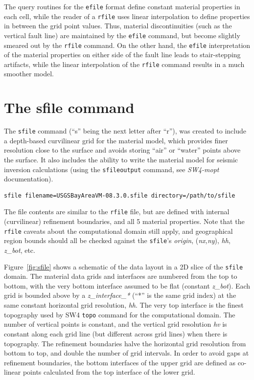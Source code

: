 \documentclass[11pt]{report}
\begin{document}
The query routines for the {\tt efile} format define constant material properties in each cell,
while the reader of a {\tt rfile} uses linear interpolation to define properties in between the grid
point values. Thus, material discontinuities (such as the vertical fault line) are maintained by 
the {\tt efile} command, but become slightly smeared out by the {\tt rfile} command. On the other
hand, the {\tt efile} interpretation of the material properties on either side of the fault line
leads to stair-stepping artifacts, while the linear interpolation of the {\tt rfile} command results
in a much smoother model.

\section{The sfile command} \label{sec:sfile-mat}
The \verb+sfile+ command (``s'' being the next letter after ``r''), was created to include a depth-based curvilinear grid for the material model,  which provides finer resolution close to the surface and avoids storing ``air'' or ``water'' points above the surface. It also includes the ability to write the material model for seismic inversion calculations (using the \verb+sfileoutput+ command, see {\em SW4-mopt} documentation).

\begin{verbatim}
sfile filename=USGSBayAreaVM-08.3.0.sfile directory=/path/to/sfile
\end{verbatim}

The file contents are similar to the \verb+rfile+ file, but are defined with internal (curvilinear) refinement boundaries, and all 5 material properties. Note that the \verb+rfile+ caveats about the computational domain still apply, and geographical region bounds should all be checked against the \verb+sfile+'s {\em origin}, ({\em nx,ny}), {\em hh}, {\em z\_bot}, etc.

Figure~\ref{fig:sfile} shows a schematic of the data layout in a 2D slice
  of the \verb+sfile+ domain.
The material data grids and interfaces are numbered from the top to bottom,
  with the very bottom interface assumed to be flat (constant {\em z\_bot}).
Each grid is bounded above by a {\em z\_interface\_*} (``*'' is the same 
  grid index) at the same constant horizontal grid resolution, {\em hh}.
The very top interface is the finest topography used by SW4 
  \verb+topo+ command for the computational domain.
The number of vertical points is constant, and the vertical grid resolution
  {\em hv} is constant along each grid line (but different across grid lines)
  when there is topography.
The refinement boundaries halve the horizontal grid resolution from bottom
  to top, and double the number of grid intervals.
In order to avoid gaps at refinement boundaries, the bottom interfaces
  of the upper grid are defined as co-linear points calculated from the top
  interface of the lower grid.
\end{document}
